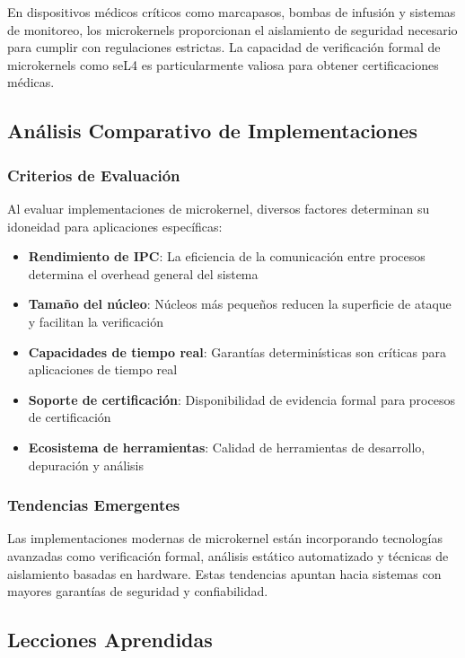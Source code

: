 \documentclass[12pt,a4paper]{article}
\begin{document}
En dispositivos médicos críticos como marcapasos, bombas de infusión y sistemas de monitoreo, los microkernels proporcionan el aislamiento de seguridad necesario para cumplir con regulaciones estrictas. La capacidad de verificación formal de microkernels como seL4 es particularmente valiosa para obtener certificaciones médicas.

\subsection{Análisis Comparativo de Implementaciones}

\subsubsection{Criterios de Evaluación}

Al evaluar implementaciones de microkernel, diversos factores determinan su idoneidad para aplicaciones específicas:

\begin{itemize}
\item \textbf{Rendimiento de IPC}: La eficiencia de la comunicación entre procesos determina el overhead general del sistema
\item \textbf{Tamaño del núcleo}: Núcleos más pequeños reducen la superficie de ataque y facilitan la verificación
\item \textbf{Capacidades de tiempo real}: Garantías determinísticas son críticas para aplicaciones de tiempo real
\item \textbf{Soporte de certificación}: Disponibilidad de evidencia formal para procesos de certificación
\item \textbf{Ecosistema de herramientas}: Calidad de herramientas de desarrollo, depuración y análisis
\end{itemize}

\subsubsection{Tendencias Emergentes}

Las implementaciones modernas de microkernel están incorporando tecnologías avanzadas como verificación formal, análisis estático automatizado y técnicas de aislamiento basadas en hardware. Estas tendencias apuntan hacia sistemas con mayores garantías de seguridad y confiabilidad.

\subsection{Lecciones Aprendidas}
\end{document}
